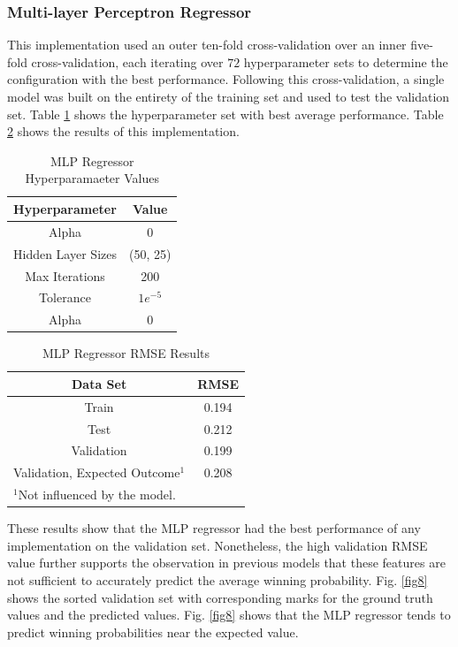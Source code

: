 \documentclass[conference]{IEEEtran}
\begin{document}
\subsubsection{Multi-layer Perceptron Regressor}
This implementation used an outer ten-fold cross-validation over an inner five-fold cross-validation, each iterating over $72$ hyperparameter sets to determine the configuration with the best performance. Following this cross-validation, a single model was built on the entirety of the training set and used to test the validation set. Table \ref{tab6} shows the hyperparameter set with best average performance. Table \ref{tab7} shows the results of this implementation.

\begin{table}[htbp]
\caption{MLP Regressor Hyperparamaeter Values}
\begin{center}
\begin{tabular}{|c||c|}
\hline
\textbf{Hyperparameter} & \textbf{Value} \\
\hline
\hline
Alpha & 0 \\
\hline
Hidden Layer Sizes & (50, 25) \\
\hline
Max Iterations & 200 \\
\hline
Tolerance & $1e^{-5}$ \\
\hline
Alpha & 0 \\
\hline
\end{tabular}
\label{tab6}
\end{center}
\end{table}

\begin{table}[htbp]
\caption{MLP Regressor RMSE Results}
\begin{center}
\begin{tabular}{|c||c|}
\hline
\textbf{Data Set} & \textbf{RMSE} \\
\hline
\hline
Train & 0.194 \\
\hline
Test & 0.212 \\
\hline
Validation & 0.199 \\
\hline
Validation, Expected Outcome$^{\mathrm{1}}$ & 0.208 \\
\hline
\multicolumn{2}{l}{$^{\mathrm{1}}$Not influenced by the model.}
\end{tabular}
\label{tab7}
\end{center}
\end{table}

These results show that the MLP regressor had the best performance of any implementation on the validation set. Nonetheless, the high validation RMSE value further supports the observation in previous models that these features are not sufficient to accurately predict the average winning probability. Fig. \ref{fig8} shows the sorted validation set with corresponding marks for the ground truth values and the predicted values.  Fig. \ref{fig8} shows that the MLP regressor tends to predict winning probabilities near the expected value. 
\end{document}
